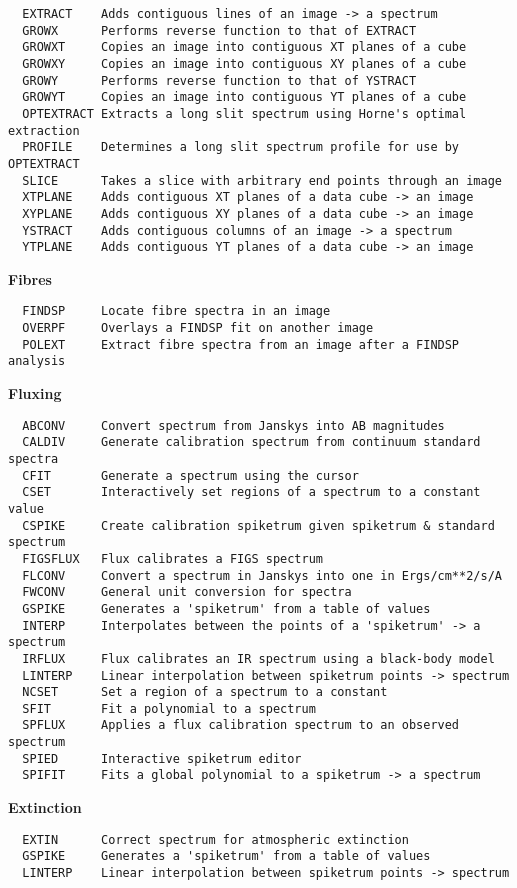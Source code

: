 \begin{verbatim}
  EXTRACT    Adds contiguous lines of an image -> a spectrum
  GROWX      Performs reverse function to that of EXTRACT
  GROWXT     Copies an image into contiguous XT planes of a cube
  GROWXY     Copies an image into contiguous XY planes of a cube
  GROWY      Performs reverse function to that of YSTRACT
  GROWYT     Copies an image into contiguous YT planes of a cube
  OPTEXTRACT Extracts a long slit spectrum using Horne's optimal extraction
  PROFILE    Determines a long slit spectrum profile for use by OPTEXTRACT
  SLICE      Takes a slice with arbitrary end points through an image
  XTPLANE    Adds contiguous XT planes of a data cube -> an image
  XYPLANE    Adds contiguous XY planes of a data cube -> an image
  YSTRACT    Adds contiguous columns of an image -> a spectrum
  YTPLANE    Adds contiguous YT planes of a data cube -> an image
\end{verbatim}
\goodbreak
{\bf Fibres}
\begin{verbatim}
  FINDSP     Locate fibre spectra in an image
  OVERPF     Overlays a FINDSP fit on another image
  POLEXT     Extract fibre spectra from an image after a FINDSP analysis
\end{verbatim}
\goodbreak
{\bf Fluxing}
\begin{verbatim}
  ABCONV     Convert spectrum from Janskys into AB magnitudes
  CALDIV     Generate calibration spectrum from continuum standard spectra
  CFIT       Generate a spectrum using the cursor
  CSET       Interactively set regions of a spectrum to a constant value
  CSPIKE     Create calibration spiketrum given spiketrum & standard spectrum
  FIGSFLUX   Flux calibrates a FIGS spectrum
  FLCONV     Convert a spectrum in Janskys into one in Ergs/cm**2/s/A
  FWCONV     General unit conversion for spectra
  GSPIKE     Generates a 'spiketrum' from a table of values
  INTERP     Interpolates between the points of a 'spiketrum' -> a spectrum
  IRFLUX     Flux calibrates an IR spectrum using a black-body model
  LINTERP    Linear interpolation between spiketrum points -> spectrum
  NCSET      Set a region of a spectrum to a constant
  SFIT       Fit a polynomial to a spectrum
  SPFLUX     Applies a flux calibration spectrum to an observed spectrum
  SPIED      Interactive spiketrum editor
  SPIFIT     Fits a global polynomial to a spiketrum -> a spectrum
\end{verbatim}
\goodbreak
{\bf Extinction}
\begin{verbatim}
  EXTIN      Correct spectrum for atmospheric extinction
  GSPIKE     Generates a 'spiketrum' from a table of values
  LINTERP    Linear interpolation between spiketrum points -> spectrum
\end{verbatim}
